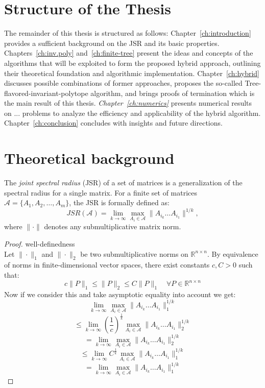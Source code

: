 \section*{Structure of the Thesis}
The remainder of this thesis is structured as follows: Chapter~\ref{ch:introduction} provides a sufficient background on the JSR and its basic properties. Chapters~\ref{ch:inv.poly} and~\ref{ch:finite-tree} present the ideas and concepts of the algorithms that will be exploited to form the proposed hybrid approach, outlining their theoretical foundation and algorithmic implementation. Chapter~\ref{ch:hybrid} discusses possible combinations of former approaches, proposes the so-called Tree-flavored-invariant-polytope algorithm, and brings proofs of termination which is the main result of this thesis. \emph{Chapter~\ref{ch:numerics}} presents numerical results on ... problems to analyze the efficiency and applicability of the hybrid algorithm. Chapter~\ref{ch:conclusion} concludes with insights and future directions.

\section{Theoretical background}

The \emph{joint spectral radius} (JSR) of a set of matrices is a generalization of the spectral radius for a single matrix. For a finite set of matrices $\mathcal{A} = \{A_1, A_2, \dots, A_m\}$, the JSR is formally defined as:
\begin{equation}
    JSR(\mathcal{A}) = \lim_{k \to \infty} \max_{A_i \in \mathcal{A}} \|A_{i_k} \dots A_{i_1}\|^{1/k},
\end{equation}
where $\|\cdot\|$ denotes any submultiplicative matrix norm.

\begin{proof}{well-definedness\\}
Let $\| \cdot \|_1$   and $ \| \cdot \|_2 $ be two submultiplicative norms on $ \mathbb{R}^{n \times n} $. By equivalence of norms in finite-dimensional vector spaces, there exist constants $ c, C > 0 $ such that:
$$
c \|P\|_1 \leq \|P\|_2 \leq C \|P\|_1 \quad \forall P \in \mathbb{R}^{n \times n}
$$
Now if we consider this and take asymptotic equality into account we get: 
$$
\lim_{k \to \infty} \max_{A_i \in \mathcal{A}} \|A_{i_k} \dots A_{i_1}\|_{1}^{1/k} 
$$
$$
\le \lim_{k \to \infty} {(\frac{1}{c})}^{\frac{1}{k}} \max_{A_i \in \mathcal{A}} \|A_{i_k} \dots A_{i_1}\|_{2}^{1/k} 
$$
$$
= \lim_{k \to \infty} \max_{A_i \in \mathcal{A}} \|A_{i_k} \dots A_{i_1}\|_{2}^{1/k} 
$$
$$
\le \lim_{k \to \infty} {C}^{\frac{1}{k}} \max_{A_i \in \mathcal{A}} \|A_{i_k} \dots A_{i_1}\|_{1}^{1/k}
$$
$$
= \lim_{k \to \infty} \max_{A_i \in \mathcal{A}} \|A_{i_k} \dots A_{i_1}\|_{1}^{1/k}
$$
\end{proof}

